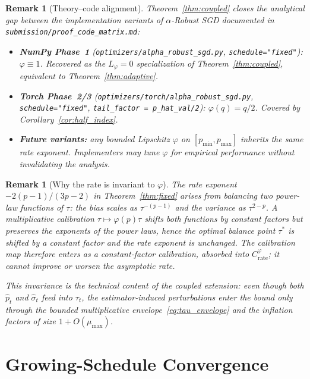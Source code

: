 \documentclass[11pt]{article}
\newtheorem{remark}[theorem]{Remark}
\theoremstyle{definition}
\newcommand{\phat}{\hat{p}}
\newcommand{\shat}{\hat{\sigma}}
\begin{document}
\begin{remark}[Theory--code alignment]\label{rem:code_align}
Theorem~\ref{thm:coupled} closes the analytical gap between the implementation
variants of $\alpha$-Robust SGD documented in
\texttt{submission/proof\_code\_matrix.md}:
\begin{itemize}[noitemsep,leftmargin=*]
  \item \textbf{NumPy Phase~1} (\texttt{optimizers/alpha\_robust\_sgd.py},
    \texttt{schedule="fixed"}): $\varphi \equiv 1$. Recovered as the
    $L_\varphi = 0$ specialization of Theorem~\ref{thm:coupled}, equivalent
    to Theorem~\ref{thm:adaptive}.
  \item \textbf{Torch Phase~2/3} (\texttt{optimizers/torch/alpha\_robust\_sgd.py},
    \texttt{schedule="fixed"}, \texttt{tail\_factor = p\_hat\_val/2}):
    $\varphi(q) = q/2$. Covered by Corollary~\ref{cor:half_index}.
  \item \textbf{Future variants:} any bounded Lipschitz $\varphi$ on
    $[p_{\min}, p_{\max}]$ inherits the same rate exponent. Implementers may
    tune $\varphi$ for empirical performance without invalidating the analysis.
\end{itemize}
\end{remark}

\begin{remark}[Why the rate is invariant to $\varphi$]\label{rem:phi_rate}
The rate exponent $-2(p-1)/(3p-2)$ in Theorem~\ref{thm:fixed} arises from
balancing two power-law functions of $\tau$: the bias scales as
$\tau^{-(p-1)}$ and the variance as $\tau^{2-p}$. A multiplicative
calibration $\tau \mapsto \varphi(p)\tau$ shifts both functions by constant
factors but preserves the \emph{exponents} of the power laws, hence the
optimal balance point $\tau^{*}$ is shifted by a constant factor and the
rate exponent is unchanged. The calibration map therefore enters as a
constant-factor calibration, absorbed into $C_{\mathrm{rate}}^\varphi$;
it cannot improve or worsen the asymptotic rate.

This invariance is the technical content of the \emph{coupled} extension:
even though both $\phat_t$ and $\shat_t$ feed into $\tau_t$, the
estimator-induced perturbations enter the bound only through the bounded
multiplicative envelope~\eqref{eq:tau_envelope} and the inflation factors
of size $1 + O(\mu_{\max})$.
\end{remark}


\section{Growing-Schedule Convergence}
\label{sec:growing}
\end{document}
